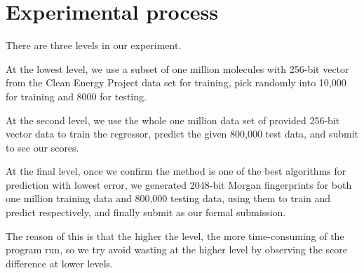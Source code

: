 \section{Experimental process}

There are three levels in our experiment.

At the lowest level, we use a subset of one million molecules with 256-bit vector from the Clean Energy Project data set for training, pick randomly into 10,000 for training and 8000 for testing. 

At the second level, we use the whole one million data set of provided 256-bit vector data to train the regressor, predict the given 800,000 test data, and submit to see our scores.

At the final level, once we confirm the method is one of the best algorithms for prediction with lowest error, we generated 2048-bit Morgan fingerprints for both one million training data and 800,000 testing data, using them to train and predict respectively, and finally submit as our formal submission. 

The reason of this is that the higher the level, the more time-consuming of the program run, so we try avoid wasting at the higher level by observing the score difference at lower levels.
